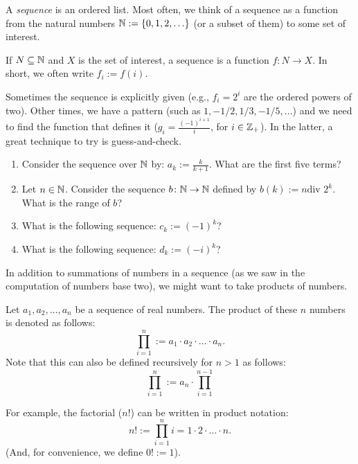 \begin{definition}[Sequence]
    A \emph{sequence} is an ordered list.  Most often, we think of a sequence as
    a function from the natural numbers ${\mathbb N}:=\{ 0,1,2, \ldots\}$ (or a subset of
    them) to some set of interest.

    If $N \subseteq {\mathbb N}$ and $X$ is the set of interest, a sequence is a
    function $f \colon N \to X$.  In short, we often write $f_i:=f(i)$.
\end{definition}

Sometimes the sequence is explicitly given (e.g., $f_i=2^i$ are the ordered
powers of two).  Other times, we have a pattern (such as $1,-1/2, 1/3, -1/5,
\ldots$) and we need to find the function that defines it ($g_i=\frac{(-1)^{i+1}}{i}$, for
$i\in {\mathbb Z}_+$).  In the latter, a great technique to try is guess-and-check.

\pagebreak


\begin{enumerate}
    \item Consider the sequence over ${\mathbb N}$ by: $a_k :=\frac{k}{k+1}$.
        What are the first five terms?
        \practice
    \item Let $n \in {\mathbb N}$.  Consider the sequence $b \colon {\mathbb N} \to {\mathbb N}$ defined
        by $b(k):= n \text {div } 2^k$.  What is the range of $b$?
        \practice
    \item What is the following sequence: $c_k := (-1)^{k}$?
        \practice
    \item What is the following sequence: $d_k := (-i)^{k}$?
        \practice
\end{enumerate}

In addition to summations of numbers in a sequence (as we saw in the computation
of numbers base two),
we might want to take products of numbers.

\begin{definition}
    Let $a_1, a_2, \ldots, a_n$ be a sequence of real numbers.
    The product of these $n$ numbers is denoted as follows:
    $$
        \prod_{i=1}^n:= a_1\cdot a_2 \cdot \ldots \cdot a_n.
    $$
    Note that this can also be defined recursively for $n > 1$ as follows:
    $$
        \prod_{i=1}^n := a_n \cdot \prod_{i=1}^{n-1}
    $$
\end{definition}

For example, the factorial ($n!$) can be written in product notation:
$$
    n! := \prod_{i=1}^n i = 1 \cdot 2 \cdot \ldots \cdot n.
$$
(And, for convenience, we define $0!:=1$).

